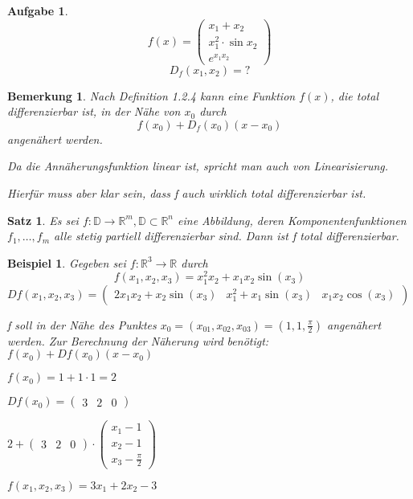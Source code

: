 \documentclass[fontset=ubuntu,12pt,a4paper]{scrreprt}
\newtheorem{bemerkung}[defi]{Bemerkung}
\newtheorem{beispiel}[defi]{Beispiel}
\newtheorem{satz}[defi]{Satz}
\newtheorem{aufg}[defi]{Aufgabe}
\begin{document}
\begin{aufg}
    \[f(x)=\begin{pmatrix}
    x_1 + x_2 \\
    x_1^2\cdot\sin x_2 \\
    e^{x_1x_2}
    \end{pmatrix}\]
    \[D_f(x_1,x_2)=?\]
\end{aufg}

\begin{bemerkung}
    Nach Definition 1.2.4 kann eine Funktion \(f(x)\), die total differenzierbar ist, in der Nähe von \(x_0\) durch \[f(x_0)+D_f(x_0)(x-x_0)\] angenähert werden.
    
    Da die Annäherungsfunktion linear ist, spricht man auch von Linearisierung.
    
    Hierfür muss aber klar sein, dass f auch wirklich total differenzierbar ist.
\end{bemerkung}

\begin{satz}
    Es sei \(f:\mathbb{D}\to \mathbb{R}^m,\mathbb{D}\subset\mathbb{R}^n\) eine Abbildung, deren Komponentenfunktionen \(f_1,\dots,f_m\) alle stetig partiell differenzierbar sind. Dann ist f total differenzierbar.
\end{satz}

\begin{beispiel}
    Gegeben sei \(f:\mathbb{R}^3\to\mathbb{R}\) durch
    \[f(x_1,x_2,x_3)=x_1^2x_2+x_1x_2\sin(x_3)\]
    \(Df(x_1,x_2,x_3)=\begin{pmatrix}
    2x_1x_2+x_2\sin(x_3) & x_1^2+x_1\sin(x_3) & x_1x_2\cos(x_3)
    \end{pmatrix}\)
    
    f soll in der Nähe des Punktes \(x_0=(x_{01},x_{02},x_{03})=(1,1,\frac{\pi}{2})\) angenähert werden. Zur Berechnung der Näherung wird benötigt: \(f(x_0)+Df(x_0)(x-x_0)\)
    
    \(f(x_0)=1+1\cdot1=2\)
    
    \(Df(x_0)=\begin{pmatrix}3 & 2 & 0\end{pmatrix}\)
    
    \(2+\begin{pmatrix}3 & 2 & 0\end{pmatrix}\cdot\begin{pmatrix}
    x_1 - 1 \\
    x_2 - 1 \\
    x_3 - \frac{\pi}{2}
    \end{pmatrix}\)
    
    \(f(x_1,x_2,x_3)=3x_1+2x_2-3\)
\end{beispiel}
\end{document}
